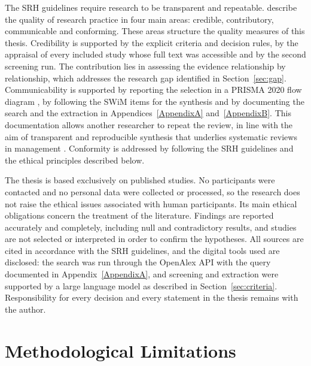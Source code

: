 The SRH guidelines require research to be transparent and repeatable. \textcite{martensson2016} describe the quality of research practice in four main areas: credible, contributory, communicable and conforming. These areas structure the quality measures of this thesis. Credibility is supported by the explicit criteria and decision rules, by the appraisal of every included study whose full text was accessible and by the second screening run. The contribution lies in assessing the evidence relationship by relationship, which addresses the research gap identified in Section~\ref{sec:gap}. Communicability is supported by reporting the selection in a PRISMA 2020 flow diagram \parencite{page2021}, by following the SWiM items for the synthesis \parencite{campbell2020} and by documenting the search and the extraction in Appendices~\ref{AppendixA} and~\ref{AppendixB}. This documentation allows another researcher to repeat the review, in line with the aim of transparent and reproducible synthesis that underlies systematic reviews in management \parencite{tranfield2003}. Conformity is addressed by following the SRH guidelines and the ethical principles described below.

The thesis is based exclusively on published studies. No participants were contacted and no personal data were collected or processed, so the research does not raise the ethical issues associated with human participants. Its main ethical obligations concern the treatment of the literature. Findings are reported accurately and completely, including null and contradictory results, and studies are not selected or interpreted in order to confirm the hypotheses. All sources are cited in accordance with the SRH guidelines, and the digital tools used are disclosed: the search was run through the OpenAlex API with the query documented in Appendix~\ref{AppendixA}, and screening and extraction were supported by a large language model as described in Section~\ref{sec:criteria}. Responsibility for every decision and every statement in the thesis remains with the author.

\section{Methodological Limitations}
\label{sec:limitations}

